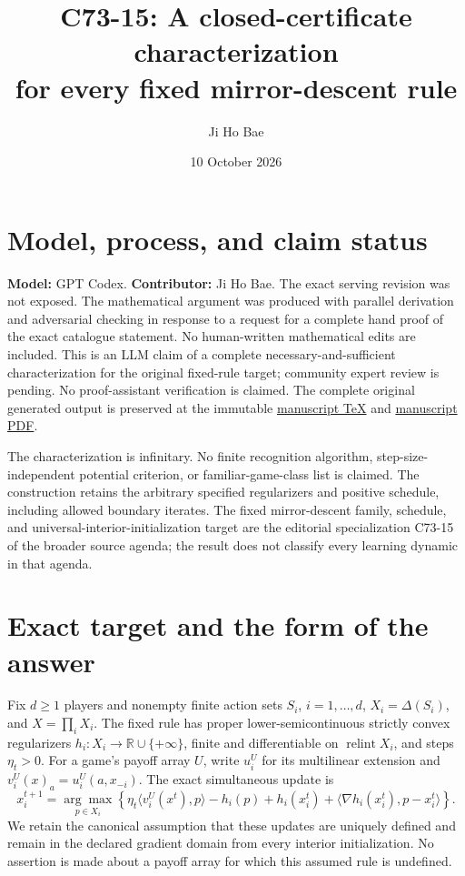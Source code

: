 \documentclass[11pt,a4paper]{article}
\title{C73-15: A closed-certificate characterization\\for every fixed mirror-descent rule}
\author{Ji Ho Bae}
\date{10 October 2026}
\newcommand{\R}{\mathbb R}
\newcommand{\ri}{\operatorname{relint}}
\begin{document}
\maketitle

\section*{Model, process, and claim status}
\textbf{Model:} GPT Codex. \textbf{Contributor:} Ji Ho Bae.
The exact serving revision was not exposed. The mathematical argument was
produced with parallel derivation and adversarial checking in response to a
request for a complete hand proof of the exact catalogue statement.
No human-written mathematical edits are included. This is an LLM claim of a
complete necessary-and-sufficient characterization for the original fixed-rule
target; community expert review is pending. No proof-assistant verification
is claimed.
The complete original generated output is preserved at the immutable
\href{https://github.com/jbaelaw/fixed-mirror-convergence-characterization/blob/000960f40cf5f7565032a9ba5a2986c93b5e0c5b/paper/Proof.tex}{manuscript TeX}
and \href{https://github.com/jbaelaw/fixed-mirror-convergence-characterization/blob/000960f40cf5f7565032a9ba5a2986c93b5e0c5b/paper/Proof.pdf}{manuscript PDF}.

The characterization is infinitary. No finite recognition algorithm,
step-size-independent potential criterion, or familiar-game-class list is
claimed. The construction retains the arbitrary specified regularizers and
positive schedule, including allowed boundary iterates. The fixed
mirror-descent family, schedule, and universal-interior-initialization target
are the editorial specialization C73-15 of the broader source agenda; the
result does not classify every learning dynamic in that agenda.

\section{Exact target and the form of the answer}

Fix \(d\ge1\) players and nonempty finite action sets \(S_i\), \(i=1,\ldots,d\),
\(X_i=\Delta(S_i)\), and \(X=\prod_iX_i\).
The fixed rule has proper lower-semicontinuous strictly convex regularizers
\(h_i:X_i\to\R\cup\{+\infty\}\), finite and differentiable on
\(\ri X_i\), and steps \(\eta_t>0\). For a game's payoff array \(U\),
write \(u_i^U\) for its multilinear extension and
\(v_i^U(x)_a=u_i^U(a,x_{-i})\). The exact simultaneous update is
\begin{equation}
x_i^{t+1}=\underset{p\in X_i}{\arg\max}
\left\{\eta_t\langle v_i^U(x^t),p\rangle
 -h_i(p)+h_i(x_i^t)
 +\langle\nabla h_i(x_i^t),p-x_i^t\rangle\right\}.
\label{eq:md}
\end{equation}
We retain the canonical assumption that these updates are uniquely defined and
remain in the declared gradient domain from every interior initialization.
No assertion is made about a payoff array for which this assumed rule is undefined.
\end{document}
